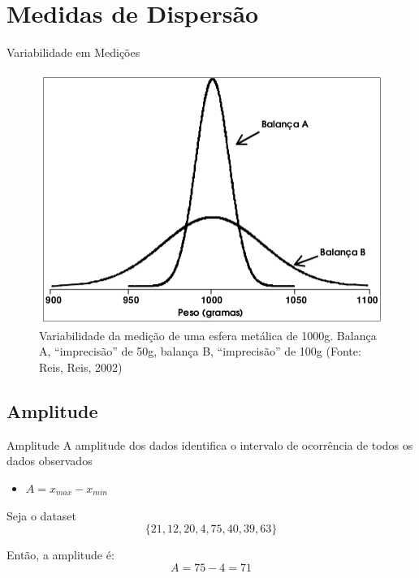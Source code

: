 \documentclass{beamer}
\begin{document}
\section{Medidas de Dispersão}

\begin{frame}{Variabilidade em Medições}
  \begin{figure}
    \includegraphics[height=0.7\textheight]{variancia}
    \caption{Variabilidade da medição de uma esfera metálica de
      1000g. Balança A, ``imprecisão'' de 50g, balança B,
      ``imprecisão'' de 100g (Fonte: Reis, Reis, 2002)}
  \end{figure}
\end{frame}

\subsection{Amplitude}
\begin{frame}{Amplitude}
  A amplitude dos dados identifica o intervalo de ocorrência de todos
  os dados observados
  \begin{itemize}
  \item $A = x_{max} - x_{min}$
  \end{itemize}
  \begin{example}
    Seja o dataset $$\{21, 12, 20, 4, 75, 40, 39, 63 \}$$

    Então, a amplitude é:
      $$A = 75 - 4 = 71$$
  \end{example}
\end{frame}
\end{document}
